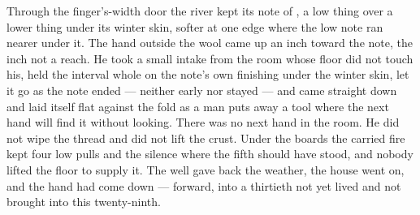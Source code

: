 Through the finger's-width door the river kept its note of , a low thing over a lower thing under its winter skin, softer at one edge where the low note ran nearer under it. The hand outside the wool came up an inch toward the note, the inch not a reach. He took a small intake from the room whose floor did not touch his, held the interval whole on the note's own finishing under the winter skin, let it go as the note ended --- neither early nor stayed --- and came straight down and laid itself flat against the fold as a man puts away a tool where the next hand will find it without looking. There was no next hand in the room. He did not wipe the thread and did not lift the crust. Under the boards the carried fire kept four low pulls and the silence where the fifth should have stood, and nobody lifted the floor to supply it. The well gave back the weather, the house went on, and the hand had come down --- forward, into a thirtieth not yet lived and not brought into this twenty-ninth.
